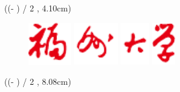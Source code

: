 {\begin{titlepage}
        \begin{textblock*}{\textwidth}(\dimexpr (\paperwidth - \textwidth) / 2 \relax, 4.10cm) %
            \begin{figure}[H]
                \centering
                \includegraphics[height=1.85cm, keepaspectratio]{TemplateAssets/fzu1.pdf}
                \hspace{0.56cm}
                \includegraphics[height=1.85cm, keepaspectratio]{TemplateAssets/fzu2.pdf}
                \hspace{0.56cm}
                \includegraphics[height=1.85cm, keepaspectratio]{TemplateAssets/fzu3.pdf}
                \hspace{0.56cm}
                \includegraphics[height=1.85cm, keepaspectratio]{TemplateAssets/fzu4.pdf}
            \end{figure}
        \end{textblock*}


        \begin{textblock*}{\textwidth}(\dimexpr (\paperwidth - \textwidth) / 2 \relax, 8.08cm)
            \begin{center}
                \tbf \yihao \hspace{1.2cm}\@title
            \end{center}
        \end{textblock*}


\end{titlepage}}
